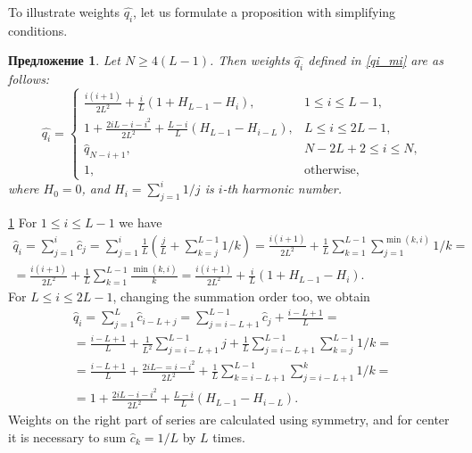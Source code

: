 \documentclass[12pt,a4paper,fleqn,leqno]{article}
\newtheorem{proposition}{Предложение}
\begin{document}
To illustrate weights $\hat{q_i}$, let us formulate a proposition with simplifying conditions.

\begin{proposition} \label{myserweightstat}
Let $N \ge 4(L-1)$. Then weights $\hat{q_i}$ defined in \eqref{qi_mi}
are as follows:
\begin{equation*}
\hat{q_i} = \begin{cases}
\frac{i(i+1)}{2 L^2} + \frac{i}{L}(1 + H_{L-1} - H_i), &1 \le i \le L-1, \\
1 + \frac{2iL-i-i^2}{2L^2} + \frac{L-i}{L}(H_{L-1} - H_{i - L}), & L \le i \le 2L-1, \\
\hat{q}_{N-i+1}, &N-2L+2 \le i \le N, \\
1, &\text{otherwise},
\end{cases}
\end{equation*}
where $H_0 = 0$, and $H_i = \sum_{j=1}^i 1/j$ is $i$-th harmonic number.
\end{proposition}

\begin{proof5}{\ref{myserweightstat}}
For $1 \le i \le L-1$ we have
\begin{gather*}
\hat{q}_i = \sum_{j=1}^i \hat{c}_j = \sum_{j=1}^i \frac{1}{L}\left(\frac{j}{L} + \sum_{k=j}^{L-1}1/k\right)\! =
\frac{i(i+1)}{2L^2}+\frac{1}{L} \sum_{k = 1}^{L-1} \sum_{j=1}^{\min(k,i)} 1/k =\\= \frac{i(i+1)}{2L^2}+\frac{1}{L} \sum_{k = 1}^{L-1} \frac{\min(k,i)}{k} = \frac{i(i+1)}{2 L^2} + \frac{i}{L}(1 + H_{L-1} - H_i).
\end{gather*}
For $L \le i \le 2L-1$, changing the summation order too, we obtain
\begin{gather*}
\hat{q}_i = \sum_{j = 1}^L \hat{c}_{i-L+j} = \sum_{j = i - L + 1}^{L - 1} \hat{c}_j + \frac{i - L + 1}{L} =\\
=\frac{i - L + 1}{L} + \frac{1}{L^2} \sum_{j = i - L + 1}^{L-1}j + \frac{1}{L} \sum_{j = i-L + 1}^{L-1} \sum_{k=j}^{L-1}1/k =\\
=\frac{i - L + 1}{L} + \frac{2iL - =i - i^2}{2L^2} + \frac{1}{L} \sum_{k = i - L + 1}^{L - 1} \sum_{j = i - L + 1}^k 1/k =\\
=1 + \frac{2iL-i-i^2}{2L^2} + \frac{L-i}{L}(H_{L-1} - H_{i - L}).
\end{gather*}
Weights on the right part of series are calculated using symmetry, and for center it is necessary to sum $\hat{c}_k = 1/L$ by $L$ times.
\end{proof5}
\end{document}
